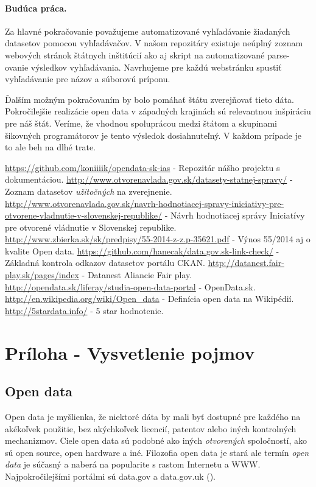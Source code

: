 \documentclass[12pt,a4paper]{article}
\begin{document}
\paragraph{Budúca práca.} 
\label{future-work} 
Za hlavné pokračovanie považujeme automatizované vyhľadávanie žiadaných datasetov pomocou vyhľadávačov. V našom repozitáry existuje neúplný zoznam webových stránok štátnych inštitúcií ako aj skript na automatizované parse-ovanie výsledkov vyhľadávania. Navrhujeme pre každú webstránku spustiť vyhľadávanie pre názov a súborovú príponu. 

Ďalším možným pokračovaním by bolo pomáhať štátu zverejňovať tieto dáta. Pokročilejšie realizácie open data v západných krajinách sú relevantnou inšpiráciu pre náš štát. Veríme, že vhodnou spoluprácou medzi štátom a skupinami šikovných programátorov je tento výsledok dosiahnuteľný. V každom prípade je to ale beh na dlhé trate. 

\renewcommand{\refname}{Literatúra}
{}
\begin{thebibliography}{99}
   \url{https://github.com/koniiiik/opendata-sk-ias} - Repozitár nášho projektu s dokumentáciou. 
   \url{http://www.otvorenavlada.gov.sk/datasety-statnej-spravy/} - Zoznam datasetov \emph{užitočných} na zverejnenie.
   \url{http://www.otvorenavlada.gov.sk/navrh-hodnotiacej-spravy-iniciativy-pre-otvorene-vladnutie-v-slovenskej-republike/} - Návrh hodnotiacej správy Iniciatívy pre otvorené vládnutie v Slovenskej republike.
   \url{http://www.zbierka.sk/sk/predpisy/55-2014-z-z.p-35621.pdf} - Výnos 55/2014 aj o kvalite Open data. 
   \url{https://github.com/hanecak/data.gov.sk-link-check/} - Základná kontrola odkazov datasetov portálu CKAN. 
   \url{http://datanest.fair-play.sk/pages/index} - Datanest Aliancie Fair play. 
   \url{http://opendata.sk/liferay/studia-open-data-portal} - OpenData.sk. 
   \url{http://en.wikipedia.org/wiki/Open_data} - Definícia open data na Wikipédií. 
   \url{http://5stardata.info/} - 5 star hodnotenie. 
\end{thebibliography}


\section*{Príloha - Vysvetlenie pojmov} 
\subsection*{Open data} 
\label{opendata} 
Open data je myšlienka, že niektoré dáta by mali byť dostupné pre každého na akékoľvek použitie, bez akýchkoľvek licencií, patentov alebo iných kontrolných mechanizmov. Ciele open data sú podobné ako iných \emph{otvorených} spoločností, ako sú open source, open hardware a iné. Filozofia open data je stará ale termín \emph{open data} je súčasný a naberá na popularite s rastom Internetu a WWW. Najpokročilejšími portálmi sú data.gov a data.gov.uk (\cite{opendata-wiki}). 
\end{document}
